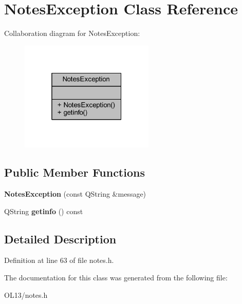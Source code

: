 \hypertarget{class_notes_exception}{}\section{Notes\+Exception Class Reference}
\label{class_notes_exception}


Collaboration diagram for Notes\+Exception\+:\nopagebreak
\begin{figure}[H]
\begin{center}
\leavevmode
\includegraphics[width=181pt]{class_notes_exception__coll__graph}
\end{center}
\end{figure}
\subsection*{Public Member Functions}
\begin{DoxyCompactItemize}
\item 
\mbox{\label{class_notes_exception_af10aca61d1cb993b62e868f0fe9bf144}} 
{\bfseries Notes\+Exception} (const Q\+String \&message)
\item 
\mbox{\label{class_notes_exception_aaa70b4b237c0fcadf5426848b54da15e}} 
Q\+String {\bfseries getinfo} () const
\end{DoxyCompactItemize}


\subsection{Detailed Description}


Definition at line 63 of file notes.\+h.



The documentation for this class was generated from the following file\+:\begin{DoxyCompactItemize}
\item 
O\+L13/notes.\+h\end{DoxyCompactItemize}
